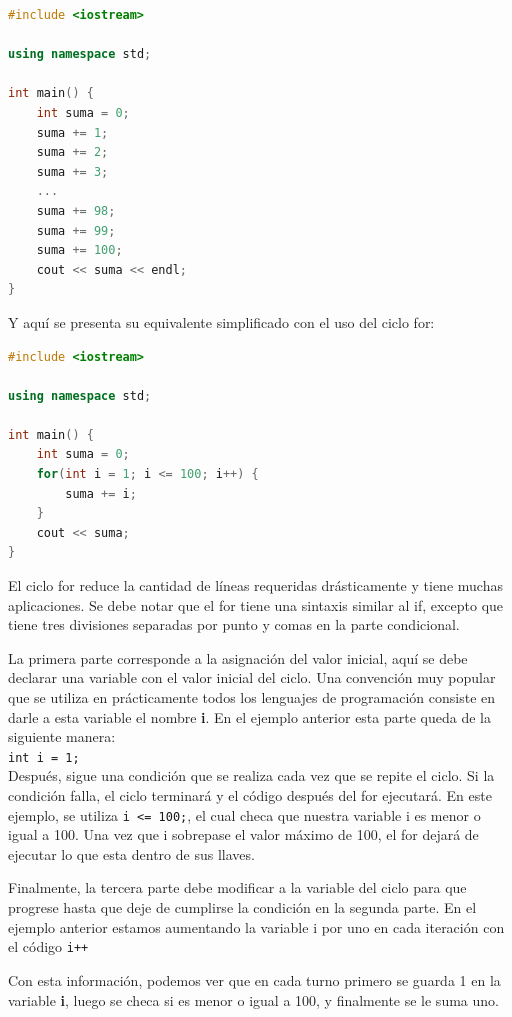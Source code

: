 \documentclass{article}
\begin{document}
\begin{lstlisting}[language=C++, title=Suma línea por línea]
#include <iostream>

using namespace std;

int main() {
	int suma = 0;
	suma += 1;
	suma += 2;
	suma += 3;
	...
	suma += 98;
	suma += 99;
	suma += 100;
	cout << suma << endl;
}
\end{lstlisting}

Y aquí se presenta su equivalente simplificado con el uso del ciclo for:

\begin{lstlisting}[language=C++, title=Suma con ciclo for]
#include <iostream>

using namespace std;

int main() {
	int suma = 0;
	for(int i = 1; i <= 100; i++) {
		suma += i;
	}
	cout << suma;
}
\end{lstlisting}

El ciclo for reduce la cantidad de líneas requeridas drásticamente y tiene muchas aplicaciones. Se debe notar que el for tiene una sintaxis similar al if, excepto que tiene tres divisiones separadas por punto y comas en la parte condicional.

La primera parte corresponde a la asignación del valor inicial, aquí se debe declarar una variable con el valor inicial del ciclo. Una convención muy popular que se utiliza en prácticamente todos los lenguajes de programación consiste en darle a esta variable el nombre \textbf{i}. En el ejemplo anterior esta parte queda de la siguiente manera: \\

\lstinline{int i = 1;} \\

Después, sigue una condición que se realiza cada vez que se repite el ciclo. Si la condición falla, el ciclo terminará y el código después del for ejecutará. En este ejemplo, se utiliza \lstinline{i <= 100;}, el cual checa que nuestra variable i es menor o igual a 100. Una vez que i sobrepase el valor máximo de 100, el for dejará de ejecutar lo que esta dentro de sus llaves.

Finalmente, la tercera parte debe modificar a la variable del ciclo para que progrese hasta que deje de cumplirse la condición en la segunda parte. En el ejemplo anterior estamos aumentando la variable i por uno en cada iteración con el código \lstinline{i++}

Con esta información, podemos ver que en cada turno primero se guarda 1 en la variable \textbf{i}, luego se checa si es menor o igual a 100, y finalmente se le suma uno.
\end{document}
